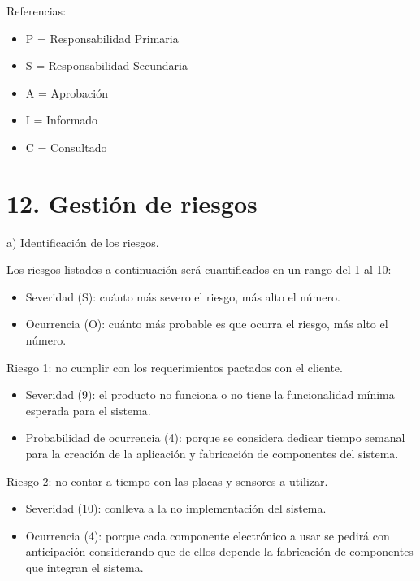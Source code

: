 \documentclass[11pt]{charter}
\begin{document}
\begin{landscape}
{\footnotesize
Referencias:

\begin{itemize}

	 \item P = Responsabilidad Primaria
	 \item S = Responsabilidad Secundaria
	 \item A = Aprobación
	 \item I = Informado
	 \item C = Consultado
\end{itemize}
} %

\end{landscape}



\section{12. Gestión de riesgos}
\label{sec:riesgos}

a) Identificación de los riesgos. 

Los riesgos listados a continuación será cuantificados en un rango del 1 al 10:
\begin{itemize}
\item Severidad (S): cuánto más severo el riesgo, más alto el número. 
\item Ocurrencia (O): cuánto más probable es que ocurra el riesgo, más alto el número.
\end{itemize}

Riesgo 1: no cumplir con los requerimientos pactados con el cliente.
\begin{itemize}
\item Severidad (9): el producto no funciona o no tiene la funcionalidad mínima esperada para el sistema.
\item Probabilidad de ocurrencia (4): porque se considera dedicar tiempo semanal para la creación de la aplicación y fabricación de componentes del sistema. 
\end{itemize}   

Riesgo 2: no contar a tiempo con las placas y sensores a utilizar.
\begin{itemize}
\item Severidad (10): conlleva a la no implementación del sistema. 
\item Ocurrencia (4): porque cada componente electrónico a usar se pedirá con anticipación considerando que de ellos depende la fabricación de componentes que integran el sistema.
\end{itemize}
\end{document}

